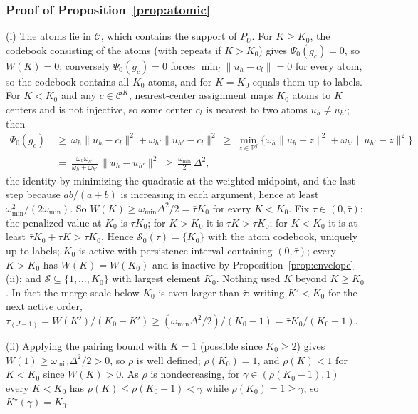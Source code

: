 \documentclass[11pt]{article}
\newcommand{\R}{\mathbb R}
\newcommand{\calC}{\mathcal C}
\newcommand{\calS}{\mathcal S}
\newcommand{\norm}[1]{\lVert #1\rVert}
\begin{document}
\subsubsection{Proof of Proposition~\ref{prop:atomic}}
(i) The atoms lie in $\calC$, which contains the support of $P_U$. For $K\ge K_0$, the codebook consisting of the atoms (with repeats if $K>K_0$) gives $\Psi_0(g_c)=0$, so $W(K)=0$; conversely $\Psi_0(g_c)=0$ forces $\min_l\norm{u_h-c_l}=0$ for every atom, so the codebook contains all $K_0$ atoms, and for $K=K_0$ equals them up to labels. For $K<K_0$ and any $c\in\calC^K$, nearest-center assignment maps $K_0$ atoms to $K$ centers and is not injective, so some center $c_l$ is nearest to two atoms $u_h\ne u_{h'}$; then
\begin{equation*}
\begin{split}
\Psi_0(g_c)\ &\ge\ \omega_h\norm{u_h-c_l}^2+\omega_{h'}\norm{u_{h'}-c_l}^2
\ \ge\ \min_{z\in\R^q}\bigl\{\omega_h\norm{u_h-z}^2+\omega_{h'}\norm{u_{h'}-z}^2\bigr\}\\
&=\ \frac{\omega_h\omega_{h'}}{\omega_h+\omega_{h'}}\,\norm{u_h-u_{h'}}^2
\ \ge\ \frac{\omega_{\min}}{2}\,\Delta^2 ,
\end{split}
\end{equation*}
the identity by minimizing the quadratic at the weighted midpoint, and the last step because $ab/(a+b)$ is increasing in each argument, hence at least $\omega_{\min}^2/(2\omega_{\min})$. So $W(K)\ge\omega_{\min}\Delta^2/2=\bar\tau K_0$ for every $K<K_0$. Fix $\tau\in(0,\bar\tau)$: the penalized value at $K_0$ is $\tau K_0$; for $K>K_0$ it is $\tau K>\tau K_0$; for $K<K_0$ it is at least $\bar\tau K_0+\tau K>\tau K_0$. Hence $\calS_0(\tau)=\{K_0\}$ with the atom codebook, uniquely up to labels; $K_0$ is active with persistence interval containing $(0,\bar\tau)$; every $K>K_0$ has $W(K)=W(K_0)$ and is inactive by Proposition~\ref{prop:envelope}(ii); and $\calS\subseteq\{1,\dots,K_0\}$ with largest element $K_0$. Nothing used $\overline K$ beyond $\overline K\ge K_0$. In fact the merge scale below $K_0$ is even larger than $\bar\tau$: writing $K'<K_0$ for the next active order, $\tau_{(J-1)}=W(K')/(K_0-K')\ge(\omega_{\min}\Delta^2/2)/(K_0-1)=\bar\tau K_0/(K_0-1)$.

(ii) Applying the pairing bound with $K=1$ (possible since $K_0\ge2$) gives $W(1)\ge\omega_{\min}\Delta^2/2>0$, so $\rho$ is well defined; $\rho(K_0)=1$, and $\rho(K)<1$ for $K<K_0$ since $W(K)>0$. As $\rho$ is nondecreasing, for $\gamma\in(\rho(K_0-1),1)$ every $K<K_0$ has $\rho(K)\le\rho(K_0-1)<\gamma$ while $\rho(K_0)=1\ge\gamma$, so $K^\star(\gamma)=K_0$.
\end{document}
